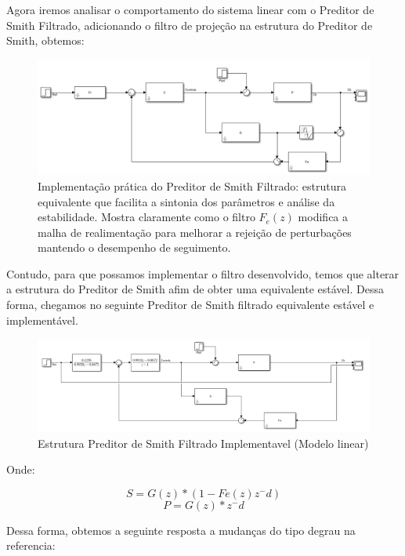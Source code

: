 \documentclass[a4paper,12pt]{article}
\begin{document}
Agora iremos analisar o comportamento do sistema linear com o Preditor de Smith Filtrado, adicionando o filtro de projeção na estrutura do Preditor de Smith, obtemos:

\begin{figure}[h]
    \centering
    \includegraphics[width=0.9\linewidth]{image2.png}
    \caption{Implementação prática do Preditor de Smith Filtrado: estrutura equivalente que facilita a sintonia dos parâmetros e análise da estabilidade. Mostra claramente como o filtro $F_e(z)$ modifica a malha de realimentação para melhorar a rejeição de perturbações mantendo o desempenho de seguimento.}
    \label{fig:psf_implementation_practical}
\end{figure}

Contudo, para que possamos implementar o filtro desenvolvido, temos que alterar a estrutura do Preditor de Smith afim de obter uma equivalente estável. Dessa forma, chegamos no seguinte Preditor de Smith filtrado equivalente estável e implementável.

\begin{figure}[H]
    \centering
    \includegraphics[width=0.9\linewidth]{image3.png}
    \caption{Estrutura Preditor de Smith Filtrado Implementavel (Modelo linear)}
    \label{fig:psf_implementation_linear}
\end{figure}

Onde:

\begin{equation}
S = G(z)*(1-Fe(z)z^-d)
\end{equation}
\begin{equation}
P = G(z)*z^-d
\end{equation}

Dessa forma, obtemos a seguinte resposta a mudanças do tipo degrau na referencia:
\end{document}
